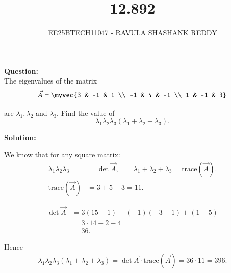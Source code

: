 \documentclass[journal]{article}
\begin{document}
	
	
	\vspace{3cm}
	
\title{12.892}
\author{EE25BTECH11047 - RAVULA SHASHANK REDDY}
\maketitle
\hrulefill
\bigskip 

\renewcommand{\thetable}{\theenumi}
\setlength{\intextsep}{10pt}

\textbf{Question:} \\

The eigenvalues of the matrix 
\[
\vec{A} = \myvec{3 & -1 & 1 \\ -1 & 5 & -1 \\ 1 & -1 & 3}
\]

are $\lambda_1, \lambda_2$ and $\lambda_3$. Find the value of 
\[
\lambda_1 \lambda_2 \lambda_3 (\lambda_1 + \lambda_2 + \lambda_3).
\]

\textbf{Solution:}

We know that for any square matrix:
\begin{align}
\lambda_1 \lambda_2 \lambda_3 &= \det \vec{A}, \qquad 
\lambda_1 + \lambda_2 + \lambda_3 = \text{trace}(\vec{A}).\\
 \text{trace}(\vec{A}) &= 3 + 5 + 3 = 11.
\end{align}

\begin{align}
\det \vec{A} 
&= 3(15-1) - (-1)(-3+1) + (1-5) \\[1mm]
&= 3\cdot 14 - 2 - 4 \\[1mm]
&= 36.
\end{align}

Hence
\begin{align}
\lambda_1 \lambda_2 \lambda_3 (\lambda_1 + \lambda_2 + \lambda_3) = \det \vec{A} \cdot \text{trace} (\vec{A}) = 36 \cdot 11 = 396.
\end{align}
\end{document}
